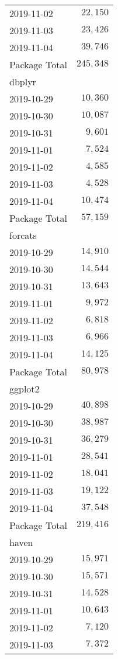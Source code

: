 \documentclass[]{article}
\begin{document}
\begin{longtable}{lr}
2019-11-02 & $22,150$ \\ 
2019-11-03 & $23,426$ \\ 
2019-11-04 & $39,746$ \\ 
\midrule 
Package Total & $245,348$ \\ 
\midrule
\multicolumn{1}{l}{dbplyr} \\ 
\midrule
2019-10-29 & $10,360$ \\ 
2019-10-30 & $10,087$ \\ 
2019-10-31 & $9,601$ \\ 
2019-11-01 & $7,524$ \\ 
2019-11-02 & $4,585$ \\ 
2019-11-03 & $4,528$ \\ 
2019-11-04 & $10,474$ \\ 
\midrule 
Package Total & $57,159$ \\ 
\midrule
\multicolumn{1}{l}{forcats} \\ 
\midrule
2019-10-29 & $14,910$ \\ 
2019-10-30 & $14,544$ \\ 
2019-10-31 & $13,643$ \\ 
2019-11-01 & $9,972$ \\ 
2019-11-02 & $6,818$ \\ 
2019-11-03 & $6,966$ \\ 
2019-11-04 & $14,125$ \\ 
\midrule 
Package Total & $80,978$ \\ 
\midrule
\multicolumn{1}{l}{ggplot2} \\ 
\midrule
2019-10-29 & $40,898$ \\ 
2019-10-30 & $38,987$ \\ 
2019-10-31 & $36,279$ \\ 
2019-11-01 & $28,541$ \\ 
2019-11-02 & $18,041$ \\ 
2019-11-03 & $19,122$ \\ 
2019-11-04 & $37,548$ \\ 
\midrule 
Package Total & $219,416$ \\ 
\midrule
\multicolumn{1}{l}{haven} \\ 
\midrule
2019-10-29 & $15,971$ \\ 
2019-10-30 & $15,571$ \\ 
2019-10-31 & $14,528$ \\ 
2019-11-01 & $10,643$ \\ 
2019-11-02 & $7,120$ \\ 
2019-11-03 & $7,372$ \\ 

\end{longtable}
\end{document}

